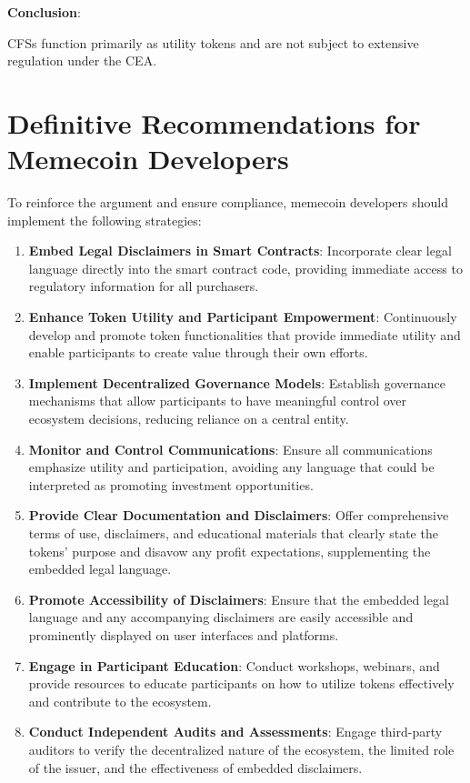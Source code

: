 \documentclass[a4paper,12pt]{article}
\begin{document}
\textbf{Conclusion}:

CFSs function primarily as utility tokens and are not subject to extensive regulation under the CEA.

\section{Definitive Recommendations for Memecoin Developers}
To reinforce the argument and ensure compliance, memecoin developers should implement the following strategies:

\begin{enumerate}[label=\arabic*)]
 \item \textbf{Embed Legal Disclaimers in Smart Contracts}: Incorporate clear legal language directly into the smart contract code, providing immediate access to regulatory information for all purchasers.
 \item \textbf{Enhance Token Utility and Participant Empowerment}: Continuously develop and promote token functionalities that provide immediate utility and enable participants to create value through their own efforts.
 \item \textbf{Implement Decentralized Governance Models}: Establish governance mechanisms that allow participants to have meaningful control over ecosystem decisions, reducing reliance on a central entity.
 \item \textbf{Monitor and Control Communications}: Ensure all communications emphasize utility and participation, avoiding any language that could be interpreted as promoting investment opportunities.
 \item \textbf{Provide Clear Documentation and Disclaimers}: Offer comprehensive terms of use, disclaimers, and educational materials that clearly state the tokens' purpose and disavow any profit expectations, supplementing the embedded legal language.
 \item \textbf{Promote Accessibility of Disclaimers}: Ensure that the embedded legal language and any accompanying disclaimers are easily accessible and prominently displayed on user interfaces and platforms.
 \item \textbf{Engage in Participant Education}: Conduct workshops, webinars, and provide resources to educate participants on how to utilize tokens effectively and contribute to the ecosystem.
 \item \textbf{Conduct Independent Audits and Assessments}: Engage third-party auditors to verify the decentralized nature of the ecosystem, the limited role of the issuer, and the effectiveness of embedded disclaimers.

\end{enumerate}
\end{document}
